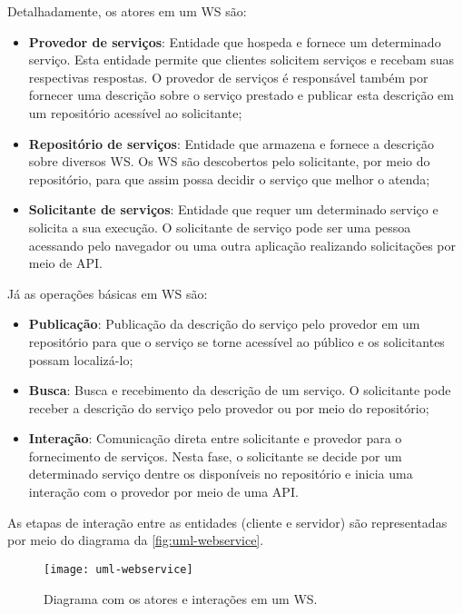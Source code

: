 Detalhadamente, os atores em um WS são:

\begin{itemize}
	\item \textbf{Provedor de serviços}: Entidade que hospeda e fornece um determinado serviço. Esta entidade permite que clientes solicitem serviços e recebam suas respectivas respostas. O provedor de serviços é responsável também por fornecer uma descrição sobre o serviço prestado e publicar esta descrição em um repositório acessível ao solicitante;

	\item \textbf{Repositório de serviços}: Entidade que armazena e fornece a descrição sobre diversos WS. Os WS são descobertos pelo solicitante, por meio do repositório, para que assim possa decidir o serviço que melhor o atenda;

	\item \textbf{Solicitante de serviços}: Entidade que requer um determinado serviço e solicita a sua execução. O solicitante de serviço pode ser uma pessoa acessando pelo navegador ou uma outra aplicação realizando solicitações por meio de API.
\end{itemize}

Já as operações básicas em WS são:

\begin{itemize}
	\item \textbf{Publicação}: Publicação da descrição do serviço pelo provedor em um repositório para que o serviço se torne acessível ao público e os solicitantes possam localizá-lo;

	\item \textbf{Busca}: Busca e recebimento da descrição de um serviço. O solicitante pode receber a descrição do serviço pelo provedor ou por meio do repositório;

	\item \textbf{Interação}: Comunicação direta entre solicitante e provedor para o fornecimento de serviços. Nesta fase, o solicitante se decide por um determinado serviço dentre os disponíveis no repositório e inicia uma interação com o provedor por meio de uma API.
\end{itemize}

As etapas de interação entre as entidades (cliente e servidor) são representadas por meio do diagrama da \autoref{fig:uml-webservice}.

\begin{figure}[htb]
	\centering
	\texttt{[image: uml-webservice]}
	\caption{Diagrama com os atores e interações em um WS.}
	\label{fig:uml-webservice}
\end{figure}

